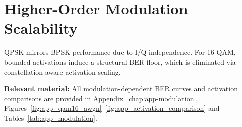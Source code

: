 \section{Higher-Order Modulation Scalability}
\label{sec:modulation-scalability}

QPSK mirrors BPSK performance due to I/Q independence.
For 16-QAM, bounded activations induce a structural BER floor, which is eliminated via constellation-aware activation scaling.

\textbf{Relevant material:}
All modulation-dependent BER curves and activation comparisons are provided in
Appendix~\ref{chap:app-modulation},
Figures~\ref{fig:app_qam16_awgn}--\ref{fig:app_activation_comparison}
and Tables~\ref{tab:app_modulation}.